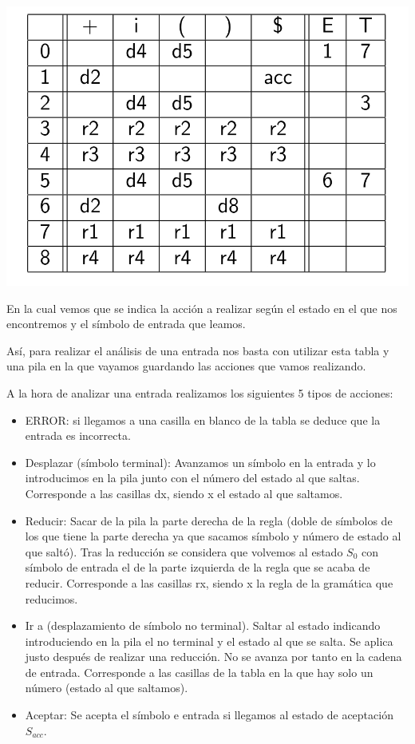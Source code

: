 \documentclass{apuntes}
\begin{document}
\begin{example}
\begin{center}
\includegraphics[scale=0.3]{img/tablaanallr0.jpg}
\end{center}

En la cual vemos que se indica la acción a realizar según el estado en el que nos encontremos y el símbolo de entrada que leamos.

Así, para realizar el análisis de una entrada nos basta con utilizar esta tabla y una pila en la que vayamos guardando las acciones que vamos realizando.

A la hora de analizar una entrada realizamos los siguientes 5 tipos de acciones:
\begin{itemize}
\item ERROR: si llegamos a una casilla en blanco de la tabla se deduce que la entrada es incorrecta.
\item Desplazar (símbolo terminal): Avanzamos un símbolo en la entrada y lo introducimos en la pila junto con el número del estado al que saltas. Corresponde a las casillas dx, siendo x el estado al que saltamos.
\item Reducir: Sacar de la pila la parte derecha de la regla (doble de símbolos de los que tiene la parte derecha ya que sacamos símbolo y número de estado al que saltó). Tras la reducción se considera que volvemos al estado $S_0$ con símbolo de entrada el de la parte izquierda de la regla que se acaba de reducir. Corresponde a las casillas rx, siendo x la regla de la gramática que reducimos.
\item Ir a (desplazamiento de símbolo no terminal). Saltar al estado indicando introduciendo en la pila el no terminal y el estado al que se salta. Se aplica justo después de realizar una reducción. No se avanza por tanto en la cadena de entrada. Corresponde a las casillas de la tabla en la que hay solo un número (estado al que saltamos).
\item Aceptar: Se acepta el símbolo e entrada si llegamos al estado de aceptación $S_{acc}$.
\end{itemize}


\end{example}
\end{document}
